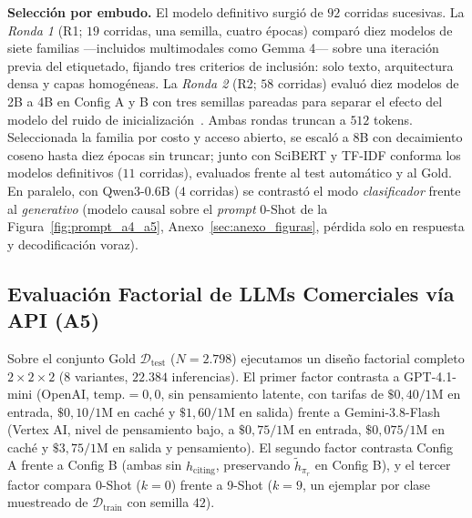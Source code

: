 \documentclass[conference]{IEEEtran}
\begin{document}
\textbf{Selección por embudo.} El modelo definitivo surgió de $92$ corridas sucesivas. La \textit{Ronda 1} (R1; $19$ corridas, una semilla, cuatro épocas) comparó diez modelos de siete familias ---incluidos multimodales como Gemma 4--- sobre una iteración previa del etiquetado, fijando tres criterios de inclusión: solo texto, arquitectura densa y capas homogéneas. La \textit{Ronda 2} (R2; $58$ corridas) evaluó diez modelos de 2B a 4B en Config A y B con tres semillas pareadas para separar el efecto del modelo del ruido de inicialización~\cite{dodge2020fine}. Ambas rondas truncan a $512$ tokens. Seleccionada la familia por costo y acceso abierto, se escaló a 8B con decaimiento coseno hasta diez épocas sin truncar; junto con SciBERT y TF-IDF conforma los modelos definitivos ($11$ corridas), evaluados frente al test automático y al Gold. En paralelo, con Qwen3-0.6B ($4$ corridas) se contrastó el modo \textit{clasificador} frente al \textit{generativo} (modelo causal sobre el \textit{prompt} 0-Shot de la Figura~\ref{fig:prompt_a4_a5}, Anexo~\ref{sec:anexo_figuras}, pérdida solo en respuesta y decodificación voraz).

\subsection{Evaluación Factorial de LLMs Comerciales vía API (A5)}
\label{sec:metodo_a5}

Sobre el conjunto Gold $\mathcal{D}_{\text{test}}$ ($N = 2.798$) ejecutamos un diseño factorial completo $2 \times 2 \times 2$ ($8$ variantes, $22.384$ inferencias). El primer factor contrasta a GPT-4.1-mini (OpenAI, $\text{temp.}=0,0$, sin pensamiento latente, con tarifas de $\$0,40/1\text{M}$ en entrada, $\$0,10/1\text{M}$ en caché y $\$1,60/1\text{M}$ en salida) frente a Gemini-3.8-Flash (Vertex AI, nivel de pensamiento bajo, a $\$0,75/1\text{M}$ en entrada, $\$0,075/1\text{M}$ en caché y $\$3,75/1\text{M}$ en salida y pensamiento). El segundo factor contrasta Config A frente a Config B (ambas sin $h_{\text{citing}}$, preservando $\tilde{h}_{\pi_r}$ en Config B), y el tercer factor compara 0-Shot ($k=0$) frente a 9-Shot ($k=9$, un ejemplar por clase muestreado de $\mathcal{D}_{\text{train}}$ con semilla $42$).
\end{document}

